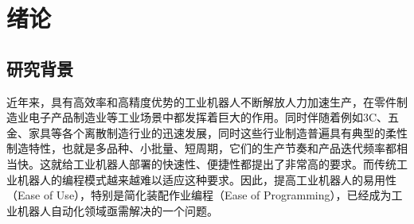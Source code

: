 \chapter{绪论}

\section{研究背景}

近年来，具有高效率和高精度优势的工业机器人不断解放人力加速生产，在零件制造业电子产品制造业等工业场景中都发挥着巨大的作用。同时伴随着例如3C、五金、家具等各个离散制造行业的迅速发展，同时这些行业制造普遍具有典型的柔性制造特性，也就是多品种、小批量、短周期，它们的生产节奏和产品迭代频率都相当快。这就给工业机器人部署的快速性、便捷性都提出了非常高的要求。而传统工业机器人的编程模式越来越难以适应这种要求。因此，提高工业机器人的易用性（Ease of Use），特别是简化装配作业编程（Ease of Programming），已经成为工业机器人自动化领域亟需解决的一个问题。

